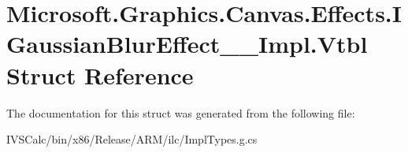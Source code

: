 \hypertarget{struct_microsoft_1_1_graphics_1_1_canvas_1_1_effects_1_1_i_gaussian_blur_effect_____impl_1_1_vtbl}{}\section{Microsoft.\+Graphics.\+Canvas.\+Effects.\+I\+Gaussian\+Blur\+Effect\+\_\+\+\_\+\+Impl.\+Vtbl Struct Reference}
\label{struct_microsoft_1_1_graphics_1_1_canvas_1_1_effects_1_1_i_gaussian_blur_effect_____impl_1_1_vtbl}


The documentation for this struct was generated from the following file\+:\begin{DoxyCompactItemize}
\item 
I\+V\+S\+Calc/bin/x86/\+Release/\+A\+R\+M/ilc/Impl\+Types.\+g.\+cs\end{DoxyCompactItemize}
